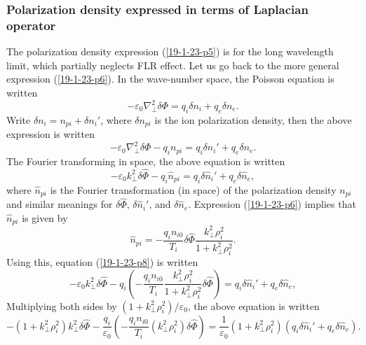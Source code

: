 \documentclass{article}
\begin{document}
\subsubsection{Polarization density expressed in terms of Laplacian operator}

The polarization density expression (\ref{19-1-23-p5}) is for the long
wavelength limit, which partially neglects FLR effect. Let us go back to the
more general expression (\ref{19-1-23-p6}). In the wave-number space, the
Poisson equation is written
\begin{equation}
  - \varepsilon_0 \nabla_{\perp}^2 \delta \Phi = q_i \delta n_i + q_e \delta
  n_e .
\end{equation}
Write $\delta n_i = n_{p i} + \delta n_i'$, where $\delta n_{p i}$ is the ion
polarization density, then the above expression is written
\begin{equation}
  - \varepsilon_0 \nabla_{\perp}^2 \delta \Phi - q_i n_{p i} = q_i \delta n_i'
  + q_e \delta n_e .
\end{equation}
The Fourier transforming in space, the above equation is written
\begin{equation}
  \label{19-1-23-p8} - \varepsilon_0 k_{\perp}^2 \delta \hat{\Phi} - q_i
  \hat{n}_{p i} = q_i \delta \hat{n}_i' + q_e \delta \hat{n}_e,
\end{equation}
where $\hat{n}_{p i}$ is the Fourier transformation (in space) of the
polarization density $n_{p i}$ and similar meanings for $\delta \hat{\Phi}$,
$\delta \hat{n}_i'$, and $\delta \hat{n}_e$. Expression (\ref{19-1-23-p6})
implies that $\hat{n}_{p i}$ is given by
\begin{equation}
  \hat{n}_{p i} = - \frac{q_i n_{i 0}}{T_i} \delta \hat{\Phi}
  \frac{k_{\perp}^2 \rho^2_i}{1 + k_{\perp}^2 \rho^2_i} .
\end{equation}
Using this, equation (\ref{19-1-23-p8}) is written
\begin{equation}
  - \varepsilon_0 k_{\perp}^2 \delta \hat{\Phi} - q_i \left( - \frac{q_i n_{i
  0}}{T_i} \frac{k_{\perp}^2 \rho^2_i}{1 + k_{\perp}^2 \rho^2_i} \delta
  \hat{\Phi} \right) = q_i \delta \hat{n}_i' + q_e \delta \hat{n}_e,
\end{equation}
Multiplying both sides by $(1 + k_{\perp}^2 \rho_i^2) / \varepsilon_0$, the
above equation is written
\begin{equation}
  - (1 + k_{\perp}^2 \rho^2_i) k_{\perp}^2 \delta \hat{\Phi} -
  \frac{q_i}{\varepsilon_0} \left( - \frac{q_i n_{i 0}}{T_i} (k_{\perp}^2
  \rho^2_i) \delta \hat{\Phi} \right) = \frac{1}{\varepsilon_0} (1 +
  k_{\perp}^2 \rho^2_i) (q_i \delta \hat{n}_i' + q_e \delta \hat{n}_e) .
\end{equation}
\end{document}
